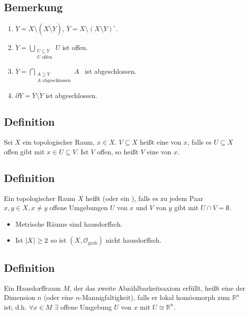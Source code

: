 \subsection[Bemerkung: Gleichungen für Inneres, Abschluss und Rand]{Bemerkung} %
\label{sub:120}
\begin{enumerate}[1)]
	\item $\mathring Y = X \setminus (\overline{X \setminus Y} )$, $\overline{Y} = X \setminus (X \setminus Y)^\circ$.
	\item $\mathring Y = \bigcup_{\substack{U \subseteq Y \\ U \text{ offen}}} U$ ist offen.
	\item $\overline{Y} = \bigcap\limits_{\substack{A \supseteq Y \\ A \text{ abgeschlossen}}} \! \! \! \! A \enspace$ ist abgeschlossen.
	\item $\partial Y = \overline{Y} \setminus \mathring Y $ ist abgeschlossen.
\end{enumerate}

\subsection[Definition: Umgebung]{Definition} %
\label{sub:121}
Sei $X$ ein topologischer Raum, $x \in X$. $V \subseteq X$ heißt eine  von $x$, falls es $U \subseteq X$ offen gibt mit $x \in U \subseteq V$. Ist $V$
offen, so heißt $V$ eine  von $x$. 

\subsection[Definition: Hausdorffraum]{Definition} %
\label{sub:122}
Ein topologischer Raum $X$ heißt  (oder ein ), falls es zu jedem Paar $x,y \in X, x \not= y$ offene Umgebungen $U$ von $x$ und
$V$ von $y$ gibt mit $U \cap V = \emptyset$.
\begin{itemize}
	\item Metrische Räume sind hausdorffsch.
	\item Ist $\abs*{X} \ge 2 $ so ist $(X, \mathcal{O}_{\text{grob}} )$ nicht hausdorffsch.
\end{itemize}

\subsection[Definition: topologische Mannigfaltigkeit]{Definition} %
\label{sub:123}
Ein Hausdorffraum $M$, der das zweite Abzählbarkeitsaxiom erfüllt, heißt eine  der Dimension $n$ (oder eine $n$-Mannigfaltigkeit), 
falls er lokal homöomorph zum $\mathds{R}^n$ ist; d.h. $\forall x \in M$ $\exists$ offene Umgebung $U$ von $x$ mit $U \cong \mathds{R}^n$.
\newpage

